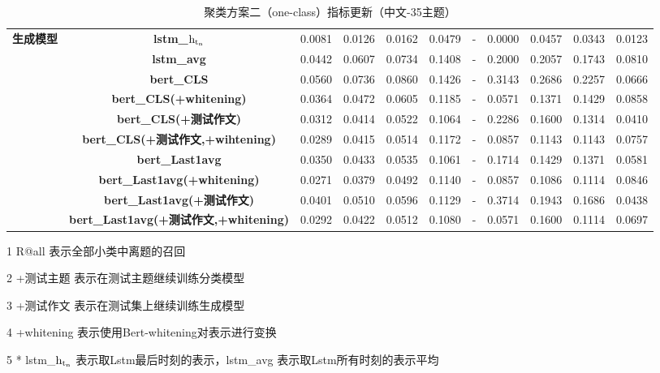 \documentclass[11pt]{article}
\begin{document}
\begin{CJK}{UTF8}{gkai}
\begin{table}[hp]
{\begin{tabular}{c|c|ccccccccc}
      \hline
      \multirow{10}[0]{*}{\textbf{生成模型}} & \textbf{lstm\_$\rm h_{t_n}$} & 0.0081  & 0.0126  & 0.0162  & 0.0479  & -     & 0.0000  & 0.0457  & 0.0343  & 0.0123  \\
      & \textbf{lstm\_avg} & 0.0442  & 0.0607  & 0.0734  & 0.1408  & -     & 0.2000  & 0.2057  & 0.1743  & 0.0810  \\
      \cline{2-11}
      & \textbf{bert\_CLS} & 0.0560  & 0.0736  & 0.0860  & 0.1426  & -     & 0.3143  & 0.2686  & 0.2257  & 0.0666  \\
      & \textbf{bert\_CLS(+whitening)} & 0.0364  & 0.0472  & 0.0605  & 0.1185  & -     & 0.0571  & 0.1371  & 0.1429  & 0.0858  \\
      & \textbf{bert\_CLS(+测试作文)} & 0.0312  & 0.0414  & 0.0522  & 0.1064  & -     & 0.2286  & 0.1600  & 0.1314  & 0.0410  \\
      & \textbf{bert\_CLS(+测试作文,+wihtening)} & 0.0289  & 0.0415  & 0.0514  & 0.1172  & -     & 0.0857  & 0.1143  & 0.1143  & 0.0757  \\
      \cline{2-11}
      & \textbf{bert\_Last1avg} & 0.0350  & 0.0433  & 0.0535  & 0.1061  & -     & 0.1714  & 0.1429  & 0.1371  & 0.0581  \\
      & \textbf{bert\_Last1avg(+whitening)} & 0.0271  & 0.0379  & 0.0492  & 0.1140  & -     & 0.0857  & 0.1086  & 0.1114  & 0.0846  \\
      & \textbf{bert\_Last1avg(+测试作文)} & 0.0401  & 0.0510  & 0.0596  & 0.1129  & -     & 0.3714  & 0.1943  & 0.1686  & 0.0438  \\
      & \textbf{bert\_Last1avg(+测试作文,+whitening)} & 0.0292  & 0.0422  & 0.0512  & 0.1080  & -     & 0.0571  & 0.1600  & 0.1114  & 0.0697  \\
      \hline
    \end{tabular}}%
    \begin{tablenotes}    %
      \footnotesize               %
      \item[1] R@all 表示全部小类中离题的召回
      \item[2] +测试主题 表示在测试主题继续训练分类模型
      \item[3] +测试作文 表示在测试集上继续训练生成模型
      \item[4] +whitening 表示使用Bert-whitening对表示进行变换
      \item[5] * lstm\_$\rm h_{t_n}$ 表示取Lstm最后时刻的表示，lstm\_avg 表示取Lstm所有时刻的表示平均 
    \end{tablenotes} 
    \caption{聚类方案二（one-class）指标更新（中文-35主题）}
  \label{tab:addlabel}%
\end{table}%


\end{CJK}
\end{document}
